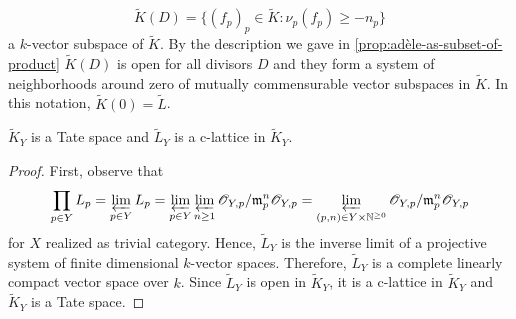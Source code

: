 \[
	\widetilde{K}(D) = \{(f_{p})_{p}\in \widetilde{K}\colon \nu_{p}(f_{p}) \geq -n_{p}\}
\]
a $k$-vector subspace of $\widetilde{K}$. By the description we gave in \cref{prop:adèle-as-subset-of-product} $\widetilde{K}(D)$ is open for all divisors $D$ and they form a system of neighborhoods around zero of mutually commensurable vector subspaces in $\widetilde{K}$. In this notation, $\widetilde{K}(0) = \widetilde{L}$.
\begin{proposition}\label{prop:adèle-is-a-tate-space}
	$\widetilde{K}_{Y}$ is a Tate space and $\widetilde{L}_{Y}$ is a c-lattice in $\widetilde{K}_{Y}$. 
\end{proposition}
\begin{proof}
	First, observe that
	\[
		\prod_{p\in Y} L_{p} = \varprojlim_{p\in Y} L_{p} = \varprojlim_{p\in Y}\varprojlim_{n\geq 1} {\mathscr O}_{Y,p}/\mathfrak{m}_{p}^{n}{\mathscr O}_{Y,p} = \varprojlim_{(p,n)\in Y\times {\mathbb N}^{\geq 0}} {\mathscr O}_{Y,p}/\mathfrak{m}_{p}^{n}{\mathscr O}_{Y,p}
	\] 
	for $X$ realized as trivial category. Hence, $\widetilde{L}_{Y}$ is the inverse limit of a projective system of finite dimensional $k$-vector spaces. Therefore, $\widetilde{L}_{Y}$ is a complete linearly compact vector space over $k$. Since $\widetilde{L}_{Y}$ is open in $\widetilde{K}_{Y}$, it is a c-lattice in $\widetilde{K}_{Y}$ and $\widetilde{K}_{Y}$ is a Tate space.
\end{proof}

